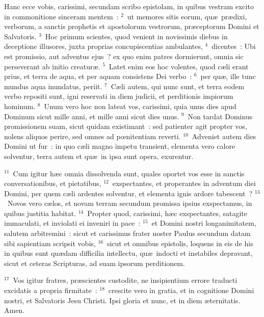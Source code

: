 \bchapter
\lettrine[lines=3,image=true,loversize=0.05,lraise=-0.03]{H}{}anc ecce vobis, carissimi, secundam scribo epistolam, in quibus vestram excito in commonitione sinceram mentem~:
${}^{2}$~ut memores sitis eorum, qu\ae\ pr\ae dixi, verborum, a sanctis prophetis et apostolorum vestrorum, pr\ae ceptorum Domini et Salvatoris.
${}^{3}$~Hoc primum scientes, quod venient in novissimis diebus in deceptione illusores, juxta proprias concupiscentias ambulantes,
${}^{4}$~dicentes~: Ubi est promissio, aut adventus ejus~? ex quo enim patres dormierunt, omnia sic perseverant ab initio creatur\ae .
${}^{5}$~Latet enim eos hoc volentes, quod c\ae li erant prius, et terra de aqua, et per aquam consistens Dei verbo~:
${}^{6}$~per qu\ae , ille tunc mundus aqua inundatus, periit.
${}^{7}$~C\ae li autem, qui nunc sunt, et terra eodem verbo repositi sunt, igni reservati in diem judicii, et perditionis impiorum hominum.
${}^{8}$~Unum vero hoc non lateat vos, carissimi, quia unus dies apud Dominum sicut mille anni, et mille anni sicut dies unus.
${}^{9}$~Non tardat Dominus promissionem suam, sicut quidam existimant~: sed patienter agit propter vos, nolens aliquos perire, sed omnes ad pœnitentiam reverti.
${}^{10}$~Adveniet autem dies Domini ut fur~: in quo c\ae li magno impetu transient, elementa vero calore solventur, terra autem et qu\ae\ in ipsa sunt opera, exurentur.


${}^{11}$~Cum igitur h\ae c omnia dissolvenda sunt, quales oportet vos esse in sanctis conversationibus, et pietatibus,
${}^{12}$~exspectantes, et properantes in adventum diei Domini, per quem c\ae li ardentes solventur, et elementa ignis ardore tabescent~?
${}^{13}$~Novos vero c\ae los, et novam terram secundum promissa ipsius exspectamus, in quibus justitia habitat.
${}^{14}$~Propter quod, carissimi, h\ae c exspectantes, satagite immaculati, et inviolati ei inveniri in pace~:
${}^{15}$~et Domini nostri longanimitatem, salutem arbitremini~: sicut et carissimus frater noster Paulus secundum datam sibi sapientiam scripsit vobis,
${}^{16}$~sicut et omnibus epistolis, loquens in eis de his in quibus sunt qu\ae dam difficilia intellectu, qu\ae\ indocti et instabiles depravant, sicut et ceteras Scripturas, ad suam ipsorum perditionem.


${}^{17}$~Vos igitur fratres, pr\ae scientes custodite, ne insipientium errore traducti excidatis a propria firmitate~:
${}^{18}$~crescite vero in gratia, et in cognitione Domini nostri, et Salvatoris Jesu Christi. Ipsi gloria et nunc, et in diem \ae ternitatis. Amen.
